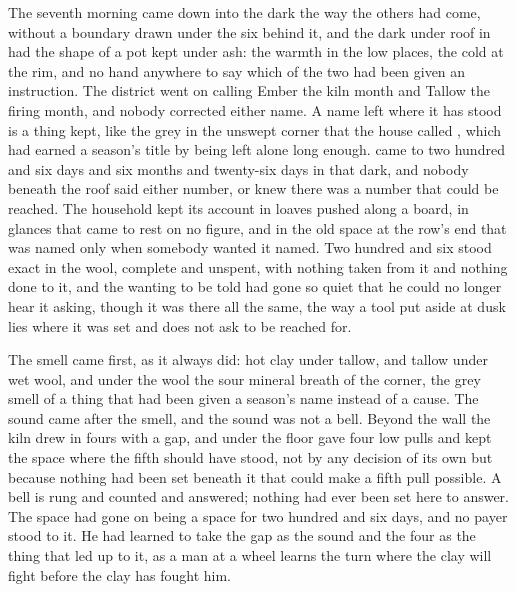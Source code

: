 
The seventh morning came down into the dark the way the others had come, without a boundary drawn under the six behind it, and the dark under  roof in  had the shape of a pot kept under ash: the warmth in the low places, the cold at the rim, and no hand anywhere to say which of the two had been given an instruction. The district went on calling Ember the kiln month and Tallow the firing month, and nobody corrected either name. A name left where it has stood is a thing kept, like the grey in the unswept corner that the house called , which had earned a season's title by being left alone long enough.  came to two hundred and six days and six months and twenty-six days in that dark, and nobody beneath the roof said either number, or knew there was a number that could be reached. The household kept its account in loaves pushed along a board, in glances that came to rest on no figure, and in the old space at the row's end that was named only when somebody wanted it named. Two hundred and six stood exact in the wool, complete and unspent, with nothing taken from it and nothing done to it, and the wanting to be told had gone so quiet that he could no longer hear it asking, though it was there all the same, the way a tool put aside at dusk lies where it was set and does not ask to be reached for.

The smell came first, as it always did: hot clay under tallow, and tallow under wet wool, and under the wool the sour mineral breath of the corner, the grey smell of a thing that had been given a season's name instead of a cause. The sound came after the smell, and the sound was not a bell. Beyond the wall the kiln drew in fours with a gap, and under the floor  gave four low pulls and kept the space where the fifth should have stood, not by any decision of its own but because nothing had been set beneath it that could make a fifth pull possible. A bell is rung and counted and answered; nothing had ever been set here to answer. The space had gone on being a space for two hundred and six days, and no payer stood to it. He had learned to take the gap as the sound and the four as the thing that led up to it, as a man at a wheel learns the turn where the clay will fight before the clay has fought him.

